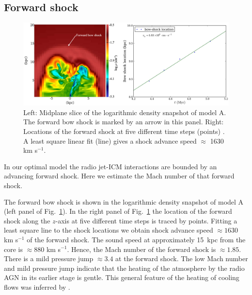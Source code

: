\documentclass[useAMS, usenatbib]{mn2e}
\begin{document}
%
%
\subsection{Forward shock} 
\begin{figure}
\centering
\includegraphics[width=\textwidth]{fig7.eps}
\caption{ Left: Midplane slice of the logarithmic density snapshot of model A. The forward bow shock is marked by an arrow in this panel. Right: Locations of the forward shock at five different time steps (points) . A least square linear fit (line) gives a shock advance speed $\approx$ 1630 km s$^{-1}$. }
\label{f:fsh}
\end{figure}

In our optimal model the radio jet-ICM interactions are bounded by an advancing forward shock. Here we estimate the Mach number of that forward shock. 

The forward bow shock is shown in the logarithmic density snapshot of model A (left panel of Fig.~\ref{f:fsh}). In the right panel of Fig.~\ref{f:fsh} the location of the forward shock along the $z$-axis at five different time steps is traced by points. Fitting a least square line to the shock locations we obtain shock advance speed $\approx  1630$ km s$^{-1}$ of the forward shock. The sound speed at approximately 15~kpc from the core is $\approx 880$ km s$^{-1}$. Hence, the Mach number of the forward shock is $\approx 1.85$. 
There is a mild pressure jump $\approx 3.4$ at the forward shock. The low Mach number and mild pressure jump indicate that the heating of the atmosphere by the radio AGN in its earlier stage is gentle. This general feature of the heating of cooling flows was inferred by \citep{mcnamara12}. 

%
%
\end{document}
